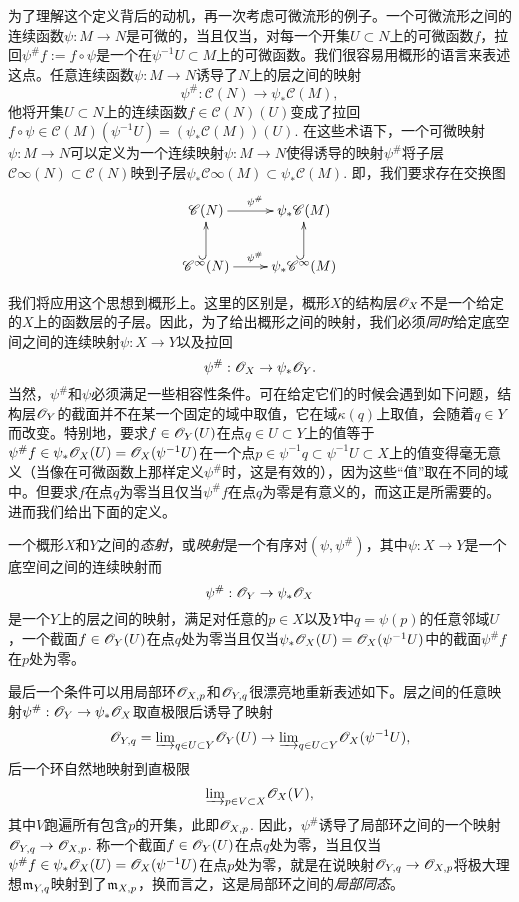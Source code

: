 为了理解这个定义背后的动机，再一次考虑可微流形的例子。一个可微流形之间的连续函数$\psi:M\to N$是可微的，当且仅当，对每一个开集$U\subset N$上的可微函数$f$，拉回$\psi^\# f:=f\circ \psi$是一个在$\psi^{-1}U\subset M$上的可微函数。我们很容易用概形的语言来表述这点。任意连续函数$\psi:M\to N$诱导了$N$上的层之间的映射
\[
	\psi^\#:\mathscr C(N)\to \psi_*\mathscr C(M),
\]
他将开集$U\subset N$上的连续函数$f\in \mathscr C(N)(U)$变成了拉回$f\circ \psi\in \mathscr C(M)(\psi^{-1}U)=(\psi_*\mathscr C(M))(U)$. 在这些术语下，一个可微映射$\psi:M\to N$可以定义为一个连续映射$\psi:M\to N$使得诱导的映射$\psi^\#$将子层$\mathscr C\infty(N)\subset \mathscr C(N)$映到子层$\psi_*\mathscr C\infty(M)\subset \psi_*\mathscr C(M)$. 即，我们要求存在交换图
\[
	\xymatrix{
	\mathscr C(N)\ar[r]^{\psi^\#}&\psi_*\mathscr C(M)\\
	\mathscr C^\infty(N)\ar[r]^{\psi^\#}\ar@{^{(}->}[u]&\psi_*\mathscr C^\infty(M)\ar@{^{(}->}[u]
	}
\]

我们将应用这个思想到概形上。这里的区别是，概形$X$的结构层$\mathscr{O}_X$不是一个给定的$X$上的函数层的子层。因此，为了给出概形之间的映射，我们必须\textit{同时}给定底空间之间的连续映射$\psi:X\to Y$以及拉回
\[
	\psi^\#:\mathscr{O}_X\to\psi_*\mathscr{O}_Y.
\]
当然，$\psi^\#$和$\psi$必须满足一些相容性条件。可在给定它们的时候会遇到如下问题，结构层$\mathscr{O}_Y$的截面并不在某一个固定的域中取值，它在域$\kappa(q)$上取值，会随着$q\in Y$而改变。特别地，要求$f\in\mathscr{O}_Y(U)$在点$q\in U\subset Y$上的值等于$\psi^\# f\in \psi_*\mathscr{O}_X(U)=\mathscr{O}_X(\psi^{-1}U)$在一个点$p\in \psi^{-1}q\subset \psi^{-1}U\subset X$上的值变得毫无意义（当像在可微函数上那样定义$\psi^\#$时，这是有效的），因为这些“值”取在不同的域中。但要求$f$在点$q$为零当且仅当$\psi^\# f$在点$q$为零是有意义的，而这正是所需要的。进而我们给出下面的定义。

\begin{defi}
一个概形$X$和$Y$之间的\textit{态射}，或\textit{映射}是一个有序对$(\psi,\psi^\#)$，其中$\psi:X\to Y$是一个底空间之间的连续映射而
\[
	\psi^\#:\mathscr{O}_Y\to \psi_*\mathscr{O}_X
\]
是一个$Y$上的层之间的映射，满足对任意的$p\in X$以及$Y$中$q=\psi(p)$的任意邻域$U$，一个截面$f\in\mathscr{O}_Y(U)$在点$q$处为零当且仅当$\psi_*\mathscr{O}_X(U)=\mathscr{O}_X(\psi^{-1}U)$中的截面$\psi^\# f$在$p$处为零。
\end{defi}

最后一个条件可以用局部环$\mathscr{O}_{X,p}$和$\mathscr{O}_{Y,q}$很漂亮地重新表述如下。层之间的任意映射$\psi^\#:\mathscr{O}_Y\to \psi_* \mathscr{O}_X$取直极限后诱导了映射
\[
	\mathscr{O}_{Y,q}={\varinjlim}_{q\in U\subset Y}\mathscr{O}_Y(U)\to {\varinjlim}_{q\in U\subset Y}\mathscr{O}_X(\psi^{-1}U),
\]
后一个环自然地映射到直极限
\[
	{\varinjlim}_{p\in V\subset X}\mathscr{O}_X(V),
\]
其中$V$跑遍所有包含$p$的开集，此即$\mathscr{O}_{X,p}$. 因此，$\psi^\#$诱导了局部环之间的一个映射$\mathscr{O}_{Y,q}\to \mathscr{O}_{X,p}$. 称一个截面$f\in \mathscr{O}_Y(U)$在点$q$处为零，当且仅当$\psi^\# f\in \psi_*\mathscr{O}_X(U)=\mathscr{O}_X(\psi^{-1}U)$在点$p$处为零，就是在说映射$\mathscr{O}_{Y,q}\to \mathscr{O}_{X,p}$将极大理想$\mathfrak{m}_{Y,q}$映射到了$\mathfrak{m}_{X,p}$，换而言之，这是局部环之间的\textit{局部同态}。

